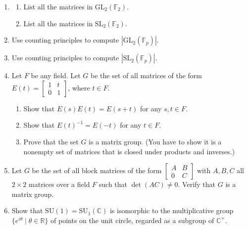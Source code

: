 \documentclass[11pt]{article}
\newenvironment{problems}
{
 \begin{enumerate}[topsep=1pt,itemsep=0pt,parsep=2pt,%
 label={\arabic*.}, ref=\arabic*] \small
}
{
 \end{enumerate}
}
\theoremstyle{definition}
\newcommand{\R}{\mathbb{R}} %
\newcommand{\C}{\mathbb{C}} %
\newcommand{\F}{{\mathbb F}}
\newcommand{\GL}{\mathrm{GL}}
\newcommand{\SL}{\mathrm{SL}}
\newcommand{\SU}{\mathrm{SU}}
\begin{document}
\begin{problems}
\item 
  \begin{enumerate}
  \item List all the matrices in $\GL_2(\F_2)$.
  \item List all the matrices in $\SL_2(\F_2)$.
  \end{enumerate}
 

\item Use counting principles to compute $|\GL_2(\F_p)|$. 

\item Use counting principles to compute $|\SL_2(\F_p)|$. 

\item Let $F$ be any field. Let $G$ be the set of all matrices of the
    form $E(t) = \begin{bmatrix} 1&t\\ 0&1
  \end{bmatrix}$, where $t \in F$. 
  \begin{enumerate}
  \item Show that $E(s) E(t) = E(s+t)$ for any
    $s,t \in F$.
  \item Show that $E(t)^{-1} = E(-t)$ for any $t \in F$.
  \item Prove that the set $G$ is a matrix group. (You have to show it
    is a nonempty set of matrices that is closed under products and
    inverses.)
  \end{enumerate}

\item Let $G$ be the set of all block matrices of the form
  $\begin{bmatrix} A&B\\ 0&C \end{bmatrix}$ with $A,B, C$ all $2\times
  2$ matrices over a field $F$ such that $\det(AC) \ne 0$. Verify that
  $G$ is a matrix group.

\item Show that $\SU(1) = \SU_1(\C)$ is isomorphic to the
  multiplicative group $\{ e^{i\theta} \mid \theta \in \R\}$ of points
  on the unit circle, regarded as a subgroup of $\C^\times$.

\end{problems}
\end{document}
